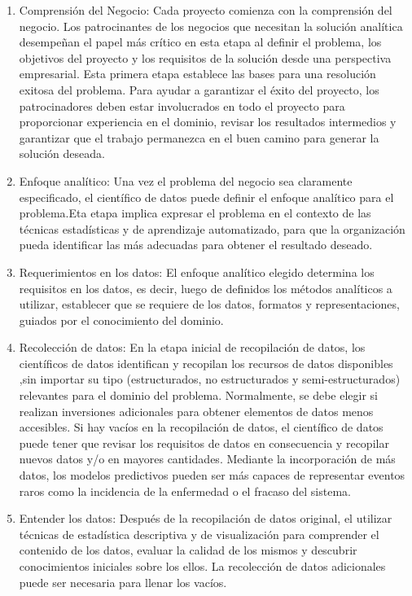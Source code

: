 \begin{enumerate}
\item Comprensión del Negocio: Cada proyecto comienza con la comprensión del negocio. Los patrocinantes de los negocios que necesitan la solución analítica desempeñan el papel más crítico en esta etapa al definir el problema, los objetivos del proyecto y los requisitos de la solución desde una perspectiva empresarial. Esta primera etapa establece las bases para una resolución exitosa del problema. Para ayudar a garantizar el éxito del proyecto, los patrocinadores deben estar involucrados en todo el proyecto para proporcionar experiencia en el dominio, revisar los resultados intermedios y garantizar que el trabajo permanezca en el buen camino para generar la solución deseada.
\item Enfoque analítico: Una vez el problema del negocio sea claramente especificado, el científico de datos puede definir el enfoque analítico para el problema.Eta etapa implica expresar el problema en el contexto de las técnicas estadísticas y de aprendizaje automatizado, para que la organización pueda identificar las más adecuadas para obtener el resultado deseado.
\item Requerimientos en los datos: El enfoque analítico elegido determina los requisitos en los datos, es decir, luego de definidos los métodos analíticos a utilizar, establecer que se requiere de los datos, formatos y representaciones, guiados por el conocimiento del dominio.
\item Recolección de datos: En la etapa inicial de recopilación de datos, los científicos de datos identifican y recopilan los recursos de datos disponibles ,sin importar su tipo (estructurados, no estructurados y semi-estructurados) relevantes para el dominio del problema. Normalmente, se debe elegir si realizan inversiones adicionales para obtener elementos de datos menos accesibles. Si hay vacíos en la recopilación de datos, el científico de datos puede tener que revisar los requisitos de datos en consecuencia y recopilar nuevos datos y/o en mayores cantidades. Mediante la incorporación de más datos, los modelos predictivos pueden ser más capaces de representar eventos raros como la incidencia de la enfermedad o el fracaso del sistema.
\item Entender los datos: Después de la recopilación de datos original, el utilizar técnicas de estadística descriptiva y de visualización para comprender el contenido de los datos, evaluar la calidad de los mismos y descubrir conocimientos iniciales sobre los ellos. La recolección de datos adicionales puede ser necesaria para llenar los vacíos.

\end{enumerate}
